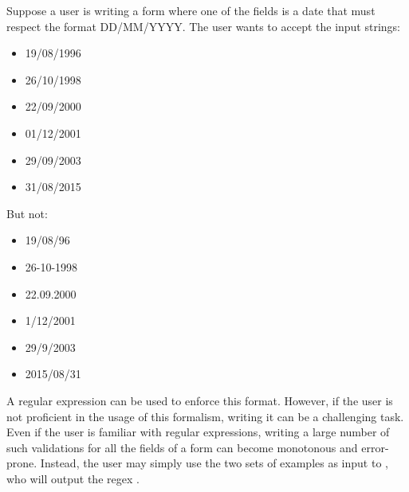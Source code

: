 Suppose a user is writing a form where one of the fields is a date that must respect the format DD/MM/YYYY.
The user wants to accept the input strings:
\begin{multicols}{3}
    \begin{itemize}[label={}]
    \item 19/08/1996
    \item 26/10/1998
    \item 22/09/2000
    \item 01/12/2001
    \item 29/09/2003
    \item 31/08/2015
    \end{itemize}
\end{multicols}
\noindent
But not:
\begin{multicols}{3}
\begin{itemize}[label={}]
\item 19/08/96
\item 26-10-1998
\item 22.09.2000
\item 1/12/2001
\item 29/9/2003
\item 2015/08/31
\end{itemize}
\end{multicols}
\noindent
A regular expression can be used to enforce this format. However, if the user is not proficient in the usage of this formalism, writing it can be a challenging task. Even if the user is familiar with regular expressions, writing a large number of such validations for all the fields of a form can become monotonous and error-prone.
Instead, the user may simply use the two sets of examples as input to \Forest{}, who will output the regex .

